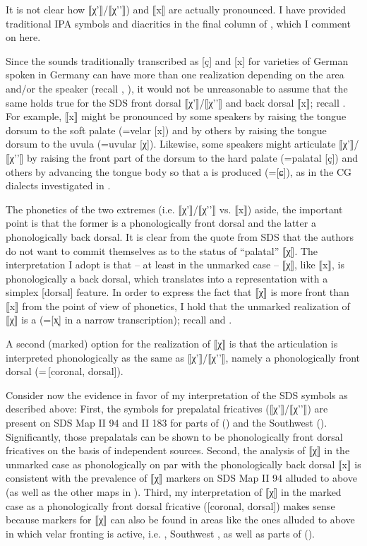 {It is not clear how ⟦χ'⟧/⟦χ'{}'⟧) and ⟦x⟧ are actually pronounced. I have provided traditional IPA symbols and diacritics in the final column of , which I comment on here.

Since the sounds traditionally transcribed as [ç] and [x] for varieties of German spoken in Germany can have more than one realization depending on the area and/or the speaker (recall , ), it would not be unreasonable to assume that the same holds true for the SDS front dorsal ⟦χ'⟧/⟦χ'{}'⟧ and back dorsal ⟦x⟧; recall . For example, ⟦x⟧ might be pronounced by some speakers by raising the tongue dorsum to the soft palate (=velar [x]) and by others by raising the tongue dorsum to the uvula (=uvular [χ]). Likewise, some speakers might articulate ⟦χ'⟧/⟦χ'{}'⟧ by raising the front part of the dorsum to the hard palate (=palatal [ç]) and others by advancing the tongue body so that a  is produced (=[ɕ]), as in the CG dialects investigated in .

The phonetics of the two extremes (i.e. ⟦χ'⟧/⟦χ'{}'⟧ vs. ⟦x⟧) aside, the important point is that the former is a phonologically front dorsal and the latter a phonologically back dorsal. It is clear from the quote from SDS that the authors do not want to commit themselves as to the status of “palatal” ⟦χ⟧. The interpretation I adopt is that -- at least in the unmarked case -- ⟦χ⟧, like ⟦x⟧, is phonologically a back dorsal, which translates into a representation with a simplex [dorsal] feature. In order to express the fact that ⟦χ⟧ is more front than ⟦x⟧ from the point of view of phonetics, I hold that the unmarked realization of ⟦χ⟧ is a  (=[x̟] in a narrow transcription); recall  and .

A second (marked) option for the realization of ⟦χ⟧ is that the articulation is interpreted phonologically as the same as ⟦χ'⟧/⟦χ'{}'⟧, namely a phonologically front dorsal (=\,[coronal, dorsal]).

Consider now the evidence in favor of my interpretation of the SDS symbols as described above: First, the symbols for prepalatal fricatives (⟦χ'⟧/⟦χ'{}'⟧) are present on SDS Map II 94 and II 183 for parts of  () and the Southwest  (). Significantly, those prepalatals can be shown to be phonologically front dorsal fricatives on the basis of independent sources. Second, the analysis of ⟦χ⟧ in the unmarked case as phonologically on par with the phonologically back dorsal ⟦x⟧ is consistent with the prevalence of ⟦χ⟧ markers on SDS Map II 94 alluded to above (as well as the other maps in ). Third, my interpretation of ⟦χ⟧ in the marked case as a phonologically front dorsal fricative ([coronal, dorsal]) makes sense because markers for ⟦χ⟧ can also be found in areas like the ones alluded to above in which velar fronting is active, i.e. , Southwest , as well as parts of  ().

}
